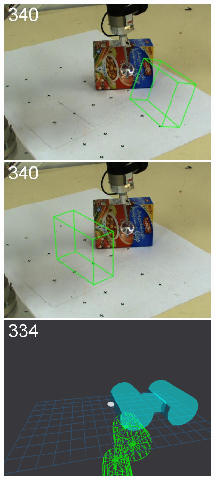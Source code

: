 \begin{figure}[tbp]
{\includegraphics[width=\imgCXwid]{images/C1_1exp_87_5}
\includegraphics[width=\imgCXwid]{images/C1_LWPR1_87_5}
\includegraphics[width=\imgCXwid]{images/C5_1exp_6_5}
}
\end{figure}
